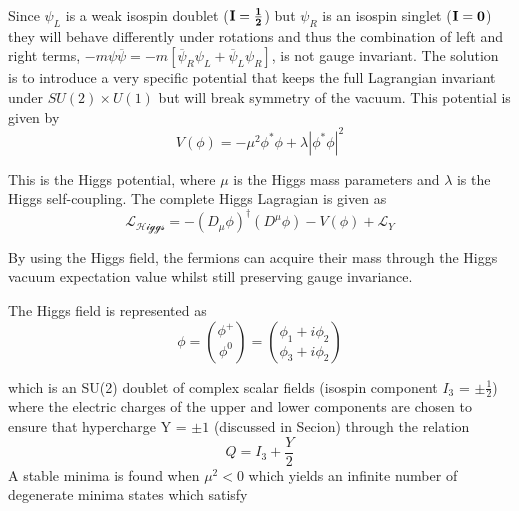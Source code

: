 


Since $\psi_{L}$ is a weak isospin doublet ($\bf{I}=\frac{1}{2}$) but $\psi_{R}$ is an isospin singlet ($\bf{I}=0$) they will behave differently under rotations and thus the combination of left and right terms, $-m\psi\overline{\psi} = -m[\overline{\psi}_{R}\psi_{L} + \overline{\psi}_{L}\psi_{R}]$, is not gauge invariant.
The solution is to introduce a very specific potential that keeps the full Lagrangian invariant under $SU(2)\times U(1)$ but will break symmetry of the vacuum.
This potential is given by
\begin{equation}
  V(\phi) = -\mu^{2}\phi^{*}\phi +\lambda|\phi^{*}\phi|^{2}
\end{equation}

This is the Higgs potential,  where $\mu$ is the Higgs mass parameters and $\lambda$ is the Higgs self-coupling. The complete Higgs Lagragian is given as 
\begin{equation}
  \mathcal{L_{Higgs}} = -(D_{\mu}\phi)^{\dagger}(D^{\mu}\phi) - V(\phi) + \mathcal{L}_{Y}
\end{equation}

By using the Higgs field, the fermions can acquire their mass through the Higgs vacuum expectation value whilst still preserving gauge invariance.

The Higgs field is represented as 
\begin{equation}
  \phi = \binom{\phi^{+}}{\phi^{0}}  = \binom{\phi_{1} + i\phi_{2}}{\phi_{3} + i\phi_{2}}
  \label{eq:higgsspin_1}
\end{equation}

which is an SU(2) doublet of complex scalar fields (isospin component $I_{3}$ =  $\pm\frac{1}{2}$) where the electric charges of the upper and lower components are chosen to ensure that hypercharge Y  = $\pm 1$ (discussed in Secion) through the relation 
\begin{equation}
  Q = I_{3}+\frac{Y}{2}
\end{equation}
A stable minima is found when $\mu^{2}<0$ which yields an infinite number of degenerate minima states which satisfy

